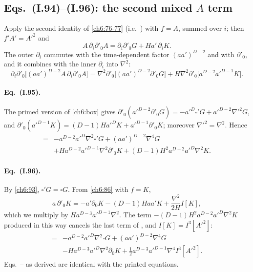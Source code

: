 \subsection{Eqs.~(I.94)--(I.96): the second mixed \texorpdfstring{$A$}{A} term \texorpdfstring{\tD}{}}
\label{ch6:94-96}

Apply the second identity of \eqref{ch6:76-77} (i.e.\ ) with $f=A$, summed over $i$; then $f'A'=A'^2$ and
\begin{equation}
A\,\partial_i\partial'_0A=\partial_i\partial'_0G+Ha'\,\partial_iK .
\end{equation}
The outer $\partial_i$ commutes with the time-dependent factor $(aa')^{D-2}$ and with $\partial'_0$, and it combines with the inner $\partial_i$
into $\nabla^2$:
\begin{equation}
\partial_i\partial'_0\big[(aa')^{D-2}A\,\partial_i\partial'_0A\big]
=\nabla^2\partial'_0\big[(aa')^{D-2}\partial'_0G\big]+H\nabla^2\partial'_0\big[a^{D-2}a'^{D-1}K\big]. \tag{I.94}
\end{equation}

\paragraph{Eq.~(I.95).} The primed version of \eqref{ch6:box} gives $\partial'_0(a'^{D-2}\partial'_0G)=-a'^D\square'G+a'^{D-2}\nabla'^2G$, and
$\partial'_0(a'^{D-1}K)=(D-1)Ha'^DK+a'^{D-1}\partial'_0K$; moreover $\nabla'^2=\nabla^2$. Hence
\begin{equation}
\begin{split}
={}&-a^{D-2}a'^D\nabla^2\square'G+(aa')^{D-2}\nabla^4G\\
&+Ha^{D-2}a'^{D-1}\nabla^2\partial'_0K+(D-1)H^2a^{D-2}a'^D\nabla^2K .
\end{split}\tag{I.95}
\end{equation}

\paragraph{Eq.~(I.96).} By \eqref{ch6:93}, $\square'G=\square G$. From \eqref{ch6:86} with $f=K$,
\begin{equation}
a\,\partial'_0K=-a'\partial_0K-(D-1)Haa'K+\frac{\nabla^2}{2H}I[K],
\end{equation}
which we multiply by $Ha^{D-3}a'^{D-1}\nabla^2$. The term $-(D-1)H^2a^{D-2}a'^D\nabla^2K$ produced in this way cancels the last term of ,
and $I[K]=I^3[A'^2]$:
\begin{equation}
\begin{split}
={}&-a^{D-2}a'^D\nabla^2\square G+(aa')^{D-2}\nabla^4G\\
&-Ha^{D-3}a'^D\nabla^2\partial_0K+\tfrac12a^{D-3}a'^{D-1}\nabla^4I^3[A'^2] .
\end{split}\tag{I.96}
\end{equation}
Eqs.~-- as derived are identical with the printed equations.

